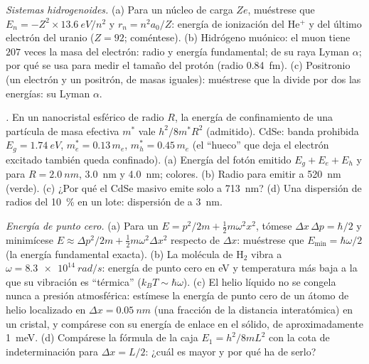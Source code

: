 \begin{exercise}[$\star\star\star$]\label{exo:b1:quantum-introduction:10}
\emph{Sistemas hidrogenoides.} (a) Para un núcleo de carga $Ze$,
muéstrese que $E_n = -Z^2 \times \qty{13.6}{eV}/n^2$ y $r_n = n^2a_0/Z$:
energía de ionización del He$^+$ y del último electrón del uranio ($Z = 92$; coméntese).
(b) Hidrógeno muónico: el muon tiene $207$ veces la masa del electrón:
radio y energía fundamental;  de su raya Lyman $\alpha$;
por qué se usa para medir el tamaño del protón (radio \qty{0.84}{fm}).
(c) Positronio (un electrón y un positrón, de masas iguales): muéstrese
que la  divide por dos las energías: su Lyman $\alpha$.
\end{exercise}

\begin{exercise}[$\star\star\star$]\label{exo:b1:quantum-introduction:11}
\emph{.} En un nanocristal esférico de radio $R$, la
energía de confinamiento de una partícula de masa efectiva $m^\ast$ vale
$h^2/8m^\ast R^2$ (admitido). CdSe: banda prohibida $E_g = \qty{1.74}{eV}$, $m_e^\ast =
0.13\,m_e$, $m_h^\ast = 0.45\,m_e$ (el ``hueco'' que deja el electrón
excitado también queda confinado). (a) Energía del fotón emitido $E_g + E_e + E_h$
y  para $R = \qty{2.0}{nm}$, \qty{3.0}{nm} y \qty{4.0}{nm}; colores.
(b) Radio para emitir a \qty{520}{nm} (verde). (c) ¿Por qué el CdSe
masivo emite solo a \qty{713}{nm}? (d) Una dispersión de radios del
\qty{10}{\percent} en un lote: dispersión de  a \qty{3}{nm}.
\end{exercise}

\begin{exercise}[$\star\star\star$]\label{exo:b1:quantum-introduction:12}
\emph{Energía de punto cero.} (a) Para un  $E = p^2/2m +
\tfrac12m\omega^2x^2$, tómese $\Delta x\,\Delta p = \hbar/2$ y minimícese $E \approx
\Delta p^2/2m + \tfrac12m\omega^2\Delta x^2$ respecto de $\Delta x$: muéstrese que $E_{\min} = \hbar\omega/2$
(la energía fundamental exacta). (b) La molécula de H$_2$ vibra a $\omega =
\qty{8.3e14}{rad/s}$: energía de punto cero en eV y temperatura más baja
a la que su vibración es ``térmica'' ($k_BT \sim \hbar\omega$).
(c) El helio líquido no se congela nunca a presión atmosférica: estímese
la energía de punto cero de un átomo de helio localizado en $\Delta x = \qty{0.05}{nm}$
(una fracción de la distancia interatómica) en un cristal, y compárese
con su energía de enlace en el sólido, de aproximadamente \qty{1}{meV}. (d) Compárese la fórmula de la caja $E_1 = h^2/8mL^2$ con la
cota de indeterminación para $\Delta x = L/2$: ¿cuál es mayor y por qué ha de serlo?
\end{exercise}

